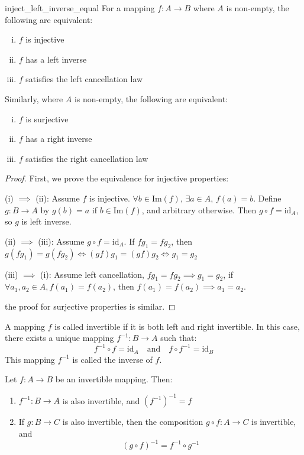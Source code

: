 \begin{proposition}{}{inject_left_inverse_equal}
  For a mapping $f : A \to B$ where $A$ is non-empty, the following are equivalent:
  \begin{enumerate}[(i)]
    \item $f$ is injective
    \item $f$ has a left inverse
    \item $f$ satisfies the left cancellation law
  \end{enumerate}

  Similarly, where $A$ is non-empty, the following are equivalent:
  \begin{enumerate}[(i)']
    \item $f$ is surjective
    \item $f$ has a right inverse
    \item $f$ satisfies the right cancellation law
  \end{enumerate}
\end{proposition}

\begin{proof}
  First, we prove the equivalence for injective properties:

  (i) $\implies$ (ii): Assume $f$ is injective.
  $\forall b \in \text{Im}(f)$, $\exists a \in A$, $f(a) = b$.
  Define $g: B \to A$ by $g(b) = a$ if $b \in \text{Im}(f)$, and arbitrary otherwise.
  Then $g \circ f = \text{id}_A$, so $g$ is left inverse.

  (ii) $\implies$ (iii): Assume $g \circ f = \text{id}_A$. If $fg_1 = fg_2$, then $g(fg_1)=g(fg_2) \iff (gf)g_1=(gf)g_2 \iff g_1=g_2$

  (iii) $\implies$ (i): Assume left cancellation, $fg_1=fg_2\implies g_1=g_2$,
  if $\forall a_1,a_2\in A,f(a_1)=f(a_2)$, then $f(a_1)=f(a_2)\implies a_1=a_2$.

  the proof for surjective properties is similar.
\end{proof}

\begin{definition}
  A mapping $f$ is called invertible if it is both left and right invertible. In this case, there exists a unique mapping $f^{-1}: B \to A$ such that:
  \[
    f^{-1} \circ f = \text{id}_A \quad \text{and} \quad f \circ f^{-1} = \text{id}_B
  \]
  This mapping $f^{-1}$ is called the inverse of $f$.
\end{definition}

\begin{proposition}
  Let $f : A \to B$ be an invertible mapping. Then:
  \begin{enumerate}
    \item $f^{-1} : B \to A$ is also invertible, and $(f^{-1})^{-1} = f$
    \item If $g : B \to C$ is also invertible, then the composition $g \circ f : A \to C$ is invertible, and
      \[
        (g \circ f)^{-1} = f^{-1} \circ g^{-1}
      \]
  \end{enumerate}
\end{proposition}

